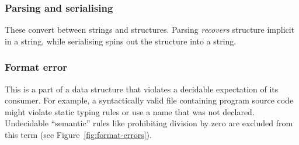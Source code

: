 \documentclass[ twoside,openright,titlepage,numbers=noenddot,headinclude,footinclude,cleardoublepage=empty,abstract=on,
                BCOR=5mm,paper=a4,fontsize=11pt
                ]{scrreprt}
\theoremstyle{definition}
\begin{document}
\hypertarget{parsing-and-serialising}{\subsubsection{Parsing and serialising}\label{parsing-and-serialising}}

These convert between strings and structures. Parsing \emph{recovers}
structure implicit in a string, while serialising spins out the
structure into a string.

\hypertarget{format-error}{\subsubsection{Format error}\label{format-error}}

This is a part of a data structure that violates a decidable expectation
of its consumer. For example, a syntactically valid file containing
program source code might violate static typing rules or use a name that
was not declared. Undecidable ``semantic'' rules like prohibiting
division by zero are excluded from this term (see
Figure~\ref{fig:format-errors}).
\end{document}
